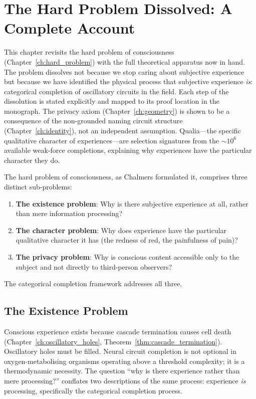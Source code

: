 \chapter{The Hard Problem Dissolved: A Complete Account}
\label{ch:hard_problem_dissolved}

\begin{chapterabstract}
This chapter revisits the hard problem of consciousness (Chapter~\ref{ch:hard_problem}) with the full theoretical apparatus now in hand. The problem dissolves not because we stop caring about subjective experience but because we have identified the physical process that subjective experience \emph{is}: categorical completion of oscillatory circuits in the \Hplus field. Each step of the dissolution is stated explicitly and mapped to its proof location in the monograph. The privacy axiom (Chapter~\ref{ch:geometry}) is shown to be a consequence of the non-grounded naming circuit structure (Chapter~\ref{ch:identity}), not an independent assumption. Qualia---the specific qualitative character of experiences---are selection signatures from the $\sim 10^6$ available weak-force completions, explaining why experiences have the particular character they do.
\end{chapterabstract}

The hard problem of consciousness, as Chalmers formulated it, comprises three distinct sub-problems:

\begin{enumerate}
  \item \textbf{The existence problem}: Why is there subjective experience at all, rather than mere information processing?
  \item \textbf{The character problem}: Why does experience have the particular qualitative character it has (the redness of red, the painfulness of pain)?
  \item \textbf{The privacy problem}: Why is conscious content accessible only to the subject and not directly to third-person observers?
\end{enumerate}

The categorical completion framework addresses all three.

\section{The Existence Problem}

Conscious experience exists because cascade termination causes cell death (Chapter~\ref{ch:oscillatory_holes}, Theorem~\ref{thm:cascade_termination}). Oscillatory holes must be filled. Neural circuit completion is not optional in oxygen-metabolising organisms operating above a threshold complexity; it is a thermodynamic necessity. The question ``why is there experience rather than mere processing?'' conflates two descriptions of the same process: experience \emph{is} processing, specifically the categorical completion process.

